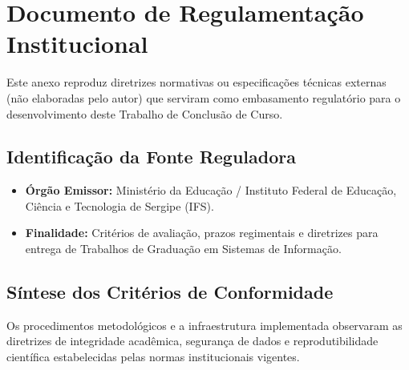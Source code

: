 \chapter{Documento de Regulamentação Institucional}
\label{anexo:documento-institucional}

Este anexo reproduz diretrizes normativas ou especificações técnicas externas (não elaboradas pelo autor) que serviram como embasamento regulatório para o desenvolvimento deste Trabalho de Conclusão de Curso.

\section{Identificação da Fonte Reguladora}

\begin{itemize}
    \item \textbf{Órgão Emissor:} Ministério da Educação / Instituto Federal de Educação, Ciência e Tecnologia de Sergipe (IFS).
    \item \textbf{Finalidade:} Critérios de avaliação, prazos regimentais e diretrizes para entrega de Trabalhos de Graduação em Sistemas de Informação.
\end{itemize}

\section{Síntese dos Critérios de Conformidade}

Os procedimentos metodológicos e a infraestrutura implementada observaram as diretrizes de integridade acadêmica, segurança de dados e reprodutibilidade científica estabelecidas pelas normas institucionais vigentes.
